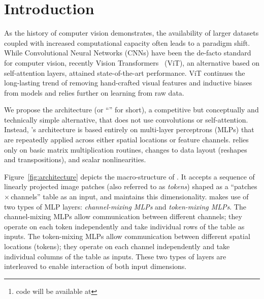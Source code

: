 \begin{abstract}
Convolutional Neural Networks (CNNs) are the go-to model for computer vision.
Recently, attention-based networks, such as the Vision Transformer, have also become popular.
In this paper we show that while convolutions and attention are both sufficient for good performance, neither of them are necessary.
We present \emph{\fullname{}}, an architecture based exclusively on multi-layer perceptrons (MLPs).
\fullname{} contains two types of layers: one with MLPs applied independently to image patches (i.e.\,``mixing'' the per-location features), and one with MLPs applied across patches (i.e.\,``mixing'' spatial information).
When trained on large datasets, or with modern regularization schemes, \fullname{} attains competitive scores on image classification benchmarks, with  pre-training and inference cost comparable to state-of-the-art models.
We hope that these results spark further research beyond the realms of well established CNNs and Transformers.\footnote{\fullname{} code will be available at 
\codeurl{}
}
\end{abstract}

\section{Introduction}

As the history of computer vision demonstrates, the availability of larger datasets coupled with increased computational capacity often leads to a paradigm shift.
While Convolutional Neural Networks (CNNs) have been the de-facto standard for computer vision, recently Vision Transformers~\citep{Dosovitskiy2021} (ViT), an alternative based on self-attention layers, attained state-of-the-art performance.
ViT continues the long-lasting trend of removing hand-crafted visual features and inductive biases from models and relies further on learning from raw data.

We propose the \emph{\fullname{}} architecture (or ``\name{}'' for short), a competitive but conceptually and technically simple alternative, that does not use convolutions or self-attention.
Instead, \name{}'s architecture is based entirely on multi-layer perceptrons (MLPs) that are repeatedly applied across either spatial locations or feature channels.
\name{} relies only on basic matrix multiplication routines, changes to data layout (reshapes and transpositions), and scalar nonlinearities.
 
Figure~\ref{fig:architecture} depicts the macro-structure of \name{}. 
It accepts a sequence of linearly projected image patches (also referred to as \emph{tokens}) shaped as a ``patches\,$\times$\,channels'' table as an input, and maintains this dimensionality.
\name{} makes use of two types of MLP layers:  \emph{channel-mixing MLPs} and \emph{token-mixing MLPs}. 
The channel-mixing MLPs allow communication between different channels; they operate on each token independently and take individual rows of the table as inputs.
The token-mixing MLPs allow communication between different spatial locations (tokens); they operate on each channel independently and take individual columns of the table as inputs.
These two types of layers are interleaved to enable interaction of both input dimensions.

